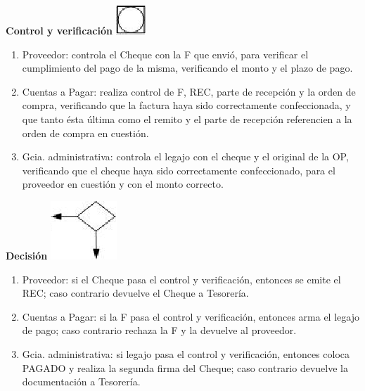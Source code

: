 \begin{center}
  \textbf{Control y verificación}
  \includegraphics{./Images/Simbolos/simbolo-Control-y-Verificacion.png}
\end{center}
\begin{enumerate}
  \item Proveedor: controla el Cheque con la F que envió, para verificar el cumplimiento del pago de la misma, verificando el monto y el plazo de pago.
  \item Cuentas a Pagar: realiza control de F, REC, parte de recepción y la orden de compra, verificando que la factura haya sido correctamente confeccionada, y que tanto ésta última como el remito y el parte de recepción referencien a la orden de compra en cuestión. 
  \item Gcia. administrativa: controla el legajo con el cheque y el original de la OP, verificando que el cheque haya sido correctamente confeccionado, para el proveedor en cuestión y con el monto correcto.
\end{enumerate}

\begin{center}
  \textbf{Decisión}
  \includegraphics{./Images/Simbolos/simbolo-Decision.png}
\end{center}
\begin{enumerate}
  \item Proveedor: si el Cheque pasa el control y verificaci\'on, entonces se emite el REC; caso contrario devuelve el Cheque a Tesorería.
  \item Cuentas a Pagar: si la F pasa el control y verificaci\'on, entonces arma el legajo de pago; caso contrario rechaza la F y la devuelve al proveedor.
  \item Gcia. administrativa: si legajo pasa el control y verificaci\'on, entonces coloca PAGADO y realiza la segunda firma del Cheque; caso contrario devuelve la documentación a Tesorería.
\end{enumerate}

